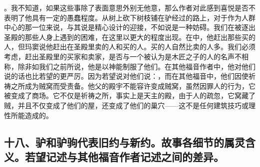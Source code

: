 。我不知道，如果这些事除了表面意思外别无他意，那么作者对此感到喜悦是否不表明了他具有一定的愚蠢程度。从树上砍下树枝铺在驴经过的路上，对于作为人群中心的那一位来说，与其说是精心设计的迎接，不如说是一种妨碍。我们在被逐出圣殿的那些人身上遇到的困难，在这里以更大的程度出现。在中，他赶出那些买的人，但玛窦说他赶出在圣殿里卖的人和买的人。买的人自然比卖的人多。我们必须考虑，赶出圣殿里的买家和卖家，是否与一个被认为是木匠之子的人的名声不相称，除非如我们之前所说，他是以神能制服了他们。在其他福音作者中，他对他们说的话也比若望的更严厉。因为若望说对他们说：，而在其他福音中，他们因使祈祷之所成为贼窝而受责备。他父的殿宇不能容许变成贼窝，虽然因罪人的行为，它被变成了商场。它不仅是祈祷之所，事实上是天主的殿，由于人的疏忽，它窝藏了贼，并且不仅变成了他们的屋，还变成了他们的巢穴——这不是任何建筑技巧或理性所能造成的。\par


\subsection{十八、驴和驴驹代表旧约与新约。故事各细节的属灵含义。若望记述与其他福音作者记述之间的差异。}

